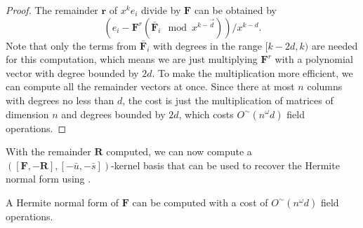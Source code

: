 \begin{proof}
The remainder $\mathbf{r}$ of $x^{k}e_{i}$ divide by $\mathbf{F}$
can be obtained by 
\[
\left(e_{i}-\mathbf{F}^{r}\left(\bar{\mathbf{F}}_{i}\mod x^{k-\vec{d}}\right)\right)/x^{k-d}.
\]
Note that only the terms from $\bar{\mathbf{F}}_{i}$ with degrees
in the range $[k-2d,k)$ are needed for this computation, which means
we are just multiplying $\mathbf{F}^{r}$ with a polynomial vector
with degree bounded by $2d$. To make the multiplication more efficient,
we can compute all the remainder vectors at once. Since there at most
$n$ columns with degrees no less than $d$, the cost is just the
multiplication of matrices of dimension $n$ and degrees bounded by
$2d$, which costs $O^{\sim}\left(n^{\omega}d\right)$ field operations.
\end{proof}
With the remainder $\mathbf{R}$ computed, we can now compute a $\left(\left[\mathbf{F},-\mathbf{R}\right],\left[-\bar{u},-\bar{s}\right]\right)$-kernel
basis that can be used to recover the Hermite normal form using .
\begin{thm}
A Hermite normal form of $\mathbf{F}$ can be computed with a cost
of \textup{$O^{\sim}\left(n^{\omega}d\right)$ field operations.}\end{thm}

